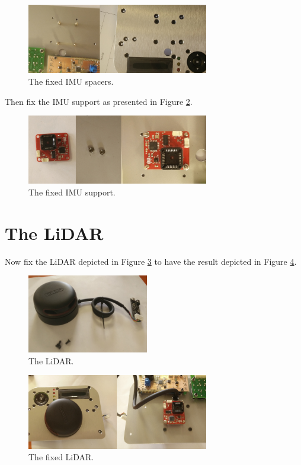 \documentclass[10pt,a4paper]{report}   %
\begin{document}
\begin{figure}[H]
\center
\includegraphics[width=300px]{images/81.jpg}
\caption{The fixed IMU spacers.}
\label{fig:81}
\end{figure}

Then fix the IMU support as presented in Figure \ref{fig:82}.

\begin{figure}[H]
\center
\includegraphics[width=300px]{images/82.jpg}
\caption{The fixed IMU support.}
\label{fig:82}
\end{figure}

\section{The LiDAR}

Now fix the LiDAR depicted in Figure \ref{fig:83} to have the result depicted in Figure \ref{fig:84}.

\begin{figure}[H]
\center
\includegraphics[width=200px]{images/83.jpg}
\caption{The LiDAR.}
\label{fig:83}
\end{figure}

\begin{figure}[H]
\center
\includegraphics[width=300px]{images/84.jpg}
\caption{The fixed LiDAR.}
\label{fig:84}
\end{figure}
\end{document}
